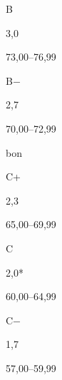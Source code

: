 \documentclass [12 pt]{article}
\begin{document}
                            
                                B
                            
                            
                                3,0
                            
                            
                                73,00–76,99
                            
                        
                        
                            
                                B−
                            
                            
                                2,7
                            
                            
                                70,00–72,99
                            
                        
                        
                            
                                bon
                            
                            
                                C+
                            
                            
                                2,3
                            
                            
                                65,00–69,99
                            
                        
                        
                            
                                C
                            
                            
                                2,0*
                            
                            
                                60,00–64,99
                            
                        
                        
                            
                                C−
                            
                            
                                1,7
                            
                            
                                57,00–59,99
                            
                        
                        
\end{document}
